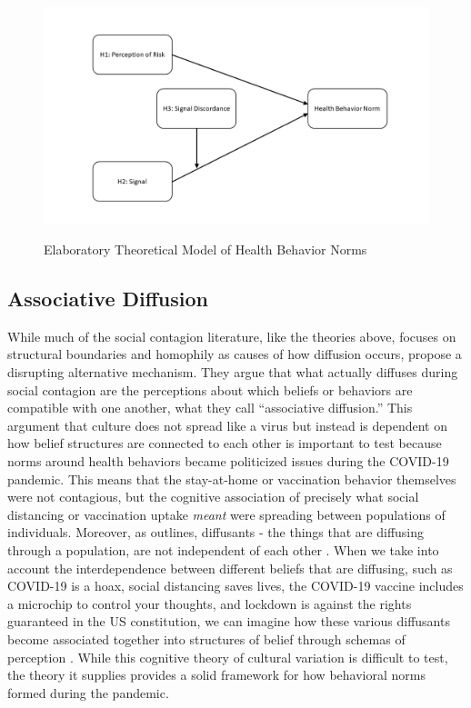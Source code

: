 \begin{figure}
{\centering \includegraphics[width=0.8\linewidth]{figs/paper3/dag}}
\caption{Elaboratory Theoretical Model of Health Behavior Norms}\label{fig:dag}
\end{figure}

\hypertarget{associative-diffusion}{%
\subsection{Associative Diffusion}\label{associative-diffusion}}

While much of the social contagion literature, like the theories above, focuses
on structural boundaries and homophily as causes of how diffusion occurs,
\citet{goldbergSocialContagionAssociative2018} propose a
disrupting alternative mechanism. They argue that what actually diffuses during
social contagion are the perceptions about which beliefs or behaviors are
compatible with one another, what they call ``associative diffusion.'' This
argument that culture does not spread like a virus but instead is dependent on
how belief structures are connected to each other is important to test because
norms around health behaviors became politicized issues during the COVID-19
pandemic. This means that the stay-at-home or vaccination behavior themselves
were not contagious, but the cognitive association of precisely what social
distancing or vaccination uptake \emph{meant} were spreading between populations of
individuals. Moreover, as \citet{houghton20} outlines, diffusants - the things that are
diffusing through a population, are not independent of each other \citep{mason_etal07}. When we take into account the interdependence between different beliefs that are diffusing, such as COVID-19 is a hoax, social distancing saves
lives, the COVID-19 vaccine includes a microchip to control your thoughts, and lockdown
is against the rights guaranteed in the US constitution, we can imagine how
these various diffusants become associated together into structures of belief
through schemas of perception \citep{houghton20}. While this cognitive theory of cultural variation is difficult to test, the theory it supplies provides a solid framework for how behavioral norms formed during the pandemic.



